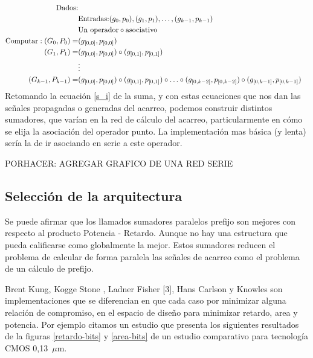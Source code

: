 \begin{equation}
\begin{align}
\text{Dados:}\\
 & \text{Entradas:} (g_0,p_0),(g_1,p_1),\dotsc,(g_{k-1},p_{k-1}) \\
 & \text{Un operador} \circ \text{asociativo}\\ 
\text{Computar}:
(G_0,P_0) = &(g_{[0,0]},p_{[0,0]})\notag\\
(G_1,P_1) = &(g_{[0,0]},p_{[0,0]})\circ(g_{[0,1]},p_{[0,1]})\notag\\
&\vdots \nonumber \\
(G_{k-1},P_{k-1}) = &(g_{[0,0]},p_{[0,0]})\circ(g_{[0,1]},p_{[0,1]})\circ \dotsc \circ(g_{[0,k-2]},p_{[0,k-2]})\circ(g_{[0,k-1]},p_{[0,k-1]})\notag
\end{align}
\end{equation}
Retomando la ecuación \ref{s_i} de la suma, y con estas ecuaciones que nos dan las señales propagadas o generadas del acarreo, podemos construir distintos sumadores, que varían en la red de cálculo del acarreo, particularmente en cómo se elija la asociación del operador punto. La implementación mas básica (y lenta) sería la de ir asociando en serie a este operador.  

PORHACER: AGREGAR GRAFICO DE UNA RED SERIE


\subsection{Selección de la arquitectura}

Se puede afirmar que los llamados sumadores paralelos prefijo son mejores con respecto al producto Potencia - Retardo. Aunque no hay una estructura que pueda calificarse como globalmente la mejor. Estos sumadores reducen el problema de calcular de forma paralela las señales de acarreo como el problema de un cálculo de prefijo.


Brent Kung\cite{brent-kung}, Kogge Stone \cite{kogge-stone}, Ladner Fisher [3], Hans Carlson\cite{kogge-stone} y Knowles\cite{knowles} son implementaciones que se diferencian en que cada caso por minimizar alguna relación de compromiso, en el espacio de diseño para minimizar retardo, area y potencia. Por ejemplo citamos un estudio que presenta los siguientes resultados de la figuras \ref{retardo-bits} y \ref{area-bits} de un estudio comparativo \cite{estrada-gimenez} para tecnología CMOS 0,13~$\mu$m.


